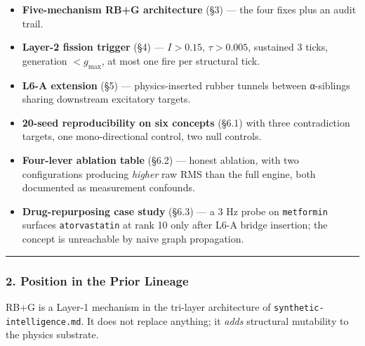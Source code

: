 \documentclass[
  11pt,
  a4paper,
]{article}
\providecommand{\tightlist}{%
  \setlength{\itemsep}{0pt}\setlength{\parskip}{0pt}}
\begin{document}
\begin{itemize}
\tightlist
\item
  \textbf{Five-mechanism RB+G architecture} (§3) --- the four fixes plus
  an audit trail.
\item
  \textbf{Layer-2 fission trigger} (§4) --- \(I > 0.15\),
  \(\tau > 0.005\), sustained 3 ticks, generation \(< g_\text{max}\), at
  most one fire per structural tick.
\item
  \textbf{L6-A extension} (§5) --- physics-inserted rubber tunnels
  between α-siblings sharing downstream excitatory targets.
\item
  \textbf{20-seed reproducibility on six concepts} (§6.1) with three
  contradiction targets, one mono-directional control, two null
  controls.
\item
  \textbf{Four-lever ablation table} (§6.2) --- honest ablation, with
  two configurations producing \emph{higher} raw RMS than the full
  engine, both documented as measurement confounds.
\item
  \textbf{Drug-repurposing case study} (§6.3) --- a 3 Hz probe on
  \texttt{metformin} surfaces \texttt{atorvastatin} at rank 10 only
  after L6-A bridge insertion; the concept is unreachable by naive graph
  propagation.
\end{itemize}

\begin{center}\rule{0.5\linewidth}{0.5pt}\end{center}

\subsubsection{2. Position in the Prior
Lineage}\label{position-in-the-prior-lineage}

RB+G is a Layer-1 mechanism in the tri-layer architecture of
\texttt{synthetic-intelligence.md}. It does not replace anything; it
\emph{adds} structural mutability to the physics substrate.
\end{document}

